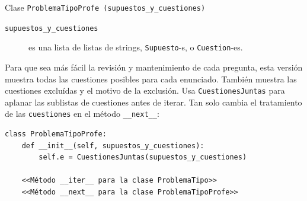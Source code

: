 \documentclass[10pt,a4paper]{report}
\begin{document}
Clase \texttt{ProblemaTipoProfe (supuestos\_y\_cuestiones)}
\begin{description}
\item[{\texttt{supuestos\_y\_cuestiones}}] es una lista de listas de strings, \texttt{Supuesto}-s, o \texttt{Cuestion}-es.
\end{description}
Para que sea más fácil la revisión y mantenimiento de cada pregunta, esta versión muestra todas las cuestiones posibles para cada enunciado.
También muestra las cuestiones excluídas y el motivo de la exclusión.
Usa \texttt{CuestionesJuntas} para aplanar las sublistas de cuestiones antes de iterar.
Tan solo cambia el tratamiento de las \texttt{cuestiones} en el método \texttt{\_\_next\_\_}:
\begin{verbatim}
class ProblemaTipoProfe:
    def __init__(self, supuestos_y_cuestiones):
        self.e = CuestionesJuntas(supuestos_y_cuestiones)

    <<Método __iter__ para la clase ProblemaTipo>>
    <<Método __next__ para la clase ProblemaTipoProfe>>
\end{verbatim}
\end{document}
